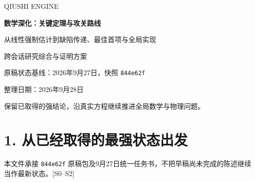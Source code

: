 \documentclass[UTF8,a4paper,11pt,fontset=fandol]{ctexart}
\begin{document}
\begin{titlepage}
\thispagestyle{empty}
\vspace*{2cm}
{\large\sffamily QIUSHI ENGINE\par}
\vspace{1.3cm}
{\Huge\bfseries 数学深化：关键定理与攻关路线\par}
\vspace{0.8cm}
{\Large 从线性强制估计到缺陷传递、最佳首项与全局实现\par}
\vspace{1.2cm}
{\large 跨会话研究综合与证明方案\par}
\vfill
{\normalsize 原稿状态基线：2026年9月27日，快照 \texttt{844e62f}\par}
\vspace{0.35cm}
{\normalsize 整理日期：2026年9月28日\par}
\vspace{1cm}
{\small 保留已取得的强结论，沿真实方程继续推进全局数学与物理问题。\par}
\end{titlepage}
\tableofcontents
\clearpage
\section{1.
从已经取得的最强状态出发}\label{ux4eceux5df2ux7ecfux53d6ux5f97ux7684ux6700ux5f3aux72b6ux6001ux51faux53d1}

本文件承接 \texttt{844e62f}
原稿包及9月27日统一任务书，不把早稿尚未完成的陈述继续当作最新状态。{[}S0--S2{]}
\end{document}
